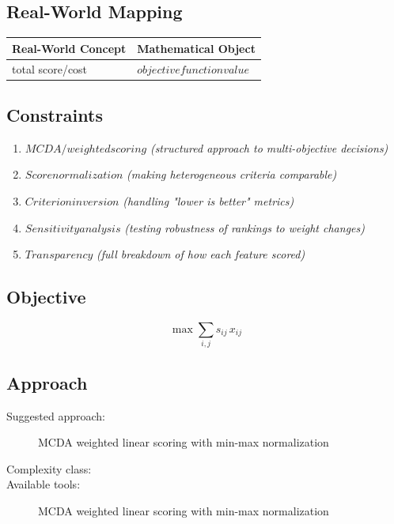 \documentclass[11pt, a4paper]{article}
\begin{document}
\subsection{Real-World Mapping}

\begin{longtable}{ll}
\toprule
\textbf{Real-World Concept} & \textbf{Mathematical Object} \\
\midrule
\endhead
total score/cost & $objective function value$ \\
\bottomrule
\end{longtable}

\subsection{Constraints}

\begin{enumerate}
  \item $MCDA / weighted scoring$
  \hfill \textit{(structured approach to multi-objective decisions)}
  \item $Score normalization$
  \hfill \textit{(making heterogeneous criteria comparable)}
  \item $Criterion inversion$
  \hfill \textit{(handling "lower is better" metrics)}
  \item $Sensitivity analysis$
  \hfill \textit{(testing robustness of rankings to weight changes)}
  \item $Transparency$
  \hfill \textit{(full breakdown of how each feature scored)}
\end{enumerate}

\subsection{Objective}

\begin{equation}
\max \sum_{i,j} s_{ij} \, x_{ij}
\end{equation}

\subsection{Approach}

\begin{description}
  \item[Suggested approach:] MCDA weighted linear scoring with min-max normalization
  \item[Complexity class:] 
  \item[Available tools:] MCDA weighted linear scoring with min-max normalization
\end{description}
\end{document}
